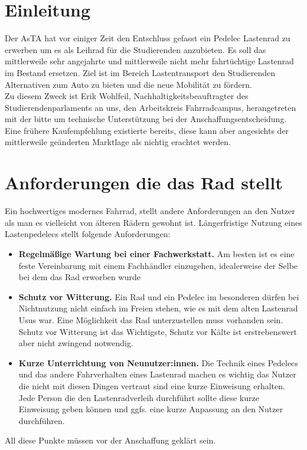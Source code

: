 \documentclass[a4paper,ngerman, 14pt] {scrartcl}
\begin{document}
\tableofcontents
\newpage
\section{Einleitung}
Der AsTA hat vor einiger Zeit den Entschluss gefasst ein Pedelec Lastenrad zu erwerben um es als Leihrad für die Studierenden anzubieten. Es soll das mittlerweile sehr angejahrte und mittlerweile nicht mehr fahrtüchtige Lastenrad im Bestand ersetzen. Ziel ist im Bereich Lastentransport den Studierenden Alternativen zum Auto zu bieten und die neue Mobilität zu fördern.\\
Zu diesem Zweck ist Erik Wohlfeil, Nachhaltigkeitsbeauftragter des Studierendenparlaments an uns, den Arbeitskreis Fahrradcampus, herangetreten mit der bitte um technische Unterstützung bei der Anschaffungsentscheidung. Eine frühere Kaufempfehlung existierte bereits, diese kann aber angesichts der mittlerweile geänderten Marktlage als nichtig erachtet werden.\\
\section{Anforderungen die das Rad stellt}
Ein hochwertiges modernes Fahrrad, stellt andere Anforderungen an den Nutzer als man es vielleicht von älteren Rädern gewohnt ist. Längerfristige Nutzung eines Lastenpedelecs stellt folgende Anforderungen:\\
\begin{itemize}
    \item \textbf{Regelmäßige Wartung bei einer Fachwerkstatt.} Am besten ist es eine feste Vereinbarung mit einem Fachhändler einzugehen, idealerweise der Selbe bei dem das Rad erworben wurde
    \item \textbf{Schutz vor Witterung.} Ein Rad und ein Pedelec im besonderen dürfen bei Nichtnutzung nicht einfach im Freien stehen, wie es mit dem alten Lastenrad Usus war. Eine Möglichkeit das Rad unterzustellen muss vorhanden sein. Schutz vor Witterung ist das Wichtigste, Schutz vor Kälte ist erstrebenswert aber nicht zwingend notwendig.
    \item \textbf{Kurze Unterrichtung von Neunutzer:innen.} Die Technik eines Pedelecs und das andere Fahrverhalten eines Lastenrad machen es wichtig das Nutzer die nicht mit diesen Dingen vertraut sind eine kurze Einweisung erhalten. Jede Person die den Lastenradverleih durchführt sollte diese kurze Einweisung geben können und ggfs. eine kurze Anpassung an den Nutzer durchführen.
\end{itemize}
All diese Punkte müssen vor der Anschaffung geklärt sein.
\end{document}
